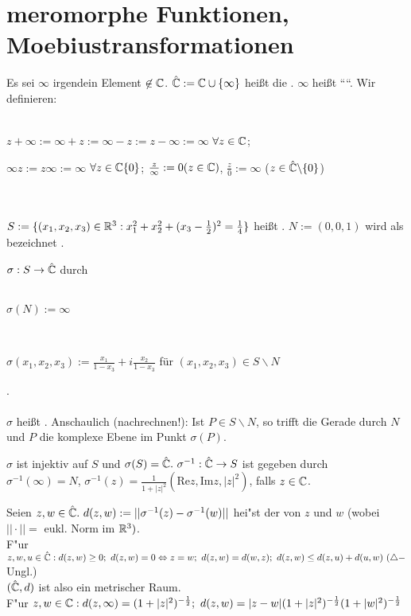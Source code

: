 \documentclass[a4paper,twoside,DIV15,BCOR12mm]{scrbook}
\begin{document}
\chapter{meromorphe Funktionen, Moebiustransformationen}
\begin{definition}
Es sei $\infty$ irgendein Element $\not \in \mathbb{C}$. $\hat{\mathbb{C}} := \mathbb{C} \cup \{ \infty
\}$ heißt die . $\infty$ heißt ````. Wir definieren: \\ \\
\centerline{$z + \infty := \infty + z := \infty -z := z - \infty := \infty$
$\forall z \in \mathbb{C}$;} \centerline{$\infty z := z \infty := \infty$ $\forall z \in \mathbb{C}
\{0\}$; $\frac{z}{\infty} := 0 (z \in \mathbb{C})$, $\frac{z}{0}:= \infty$ ($ z \in
\hat{\mathbb{C}} \backslash \{0\} $)}\\ \\
$S := \{ (x_1, x_2, x_3) \in \mathbb{R}^3: x_1^2+ x_2^2 + (x_3 - \frac{1}{2})^2 =
\frac{1}{4}\}$ heißt . $N := (0,0,1)$ wird als
 bezeichnet .
\end{definition}
\begin{definition}
$\sigma: S \to \hat{\mathbb{C}}$ durch \\ \\
\centerline{$\sigma(N) := \infty$} \\
\centerline{$\sigma(x_1, x_2, x_3) := \frac{x_1}{1-x_3} + i \frac{x_2}{1-x_3}$ für
$(x_1,x_2,x_3) \in S \backslash N$}. \\ \\
$\sigma$ heißt . Anschaulich
(nachrechnen!): Ist $P \in S \backslash N$, so trifft die Gerade durch $N$ und $P$
die komplexe Ebene im Punkt $\sigma(P)$.
\end{definition}

\begin{satz}
$\sigma$ ist injektiv auf $S$ und $\sigma(S) = \hat{\mathbb{C}}.\ \sigma^{-1}:
\hat{\mathbb{C}} \to S$ ist gegeben durch \\ $\sigma^{-1}(\infty) = N$, $\sigma^{-1}(z) =
\frac{1}{1+ |z|^2}(\text{Re} z, \text{Im} z, |z|^2)$, falls $z \in \mathbb{C}$.
\end{satz}
%
%
%

\begin{satz}
Seien $z,w \in \hat{\mathbb{C}}.\ d(z,w):= || \sigma^{-1}(z) - \sigma^{-1}(w) ||$ hei"st der  von $z$ und $w$ (wobei $||\cdot| |=$ eukl. Norm im $\mathbb{R}^3)$.\\
F"ur $z,w,u \in \hat{\MdC}: d(z,w) \geq 0;\ d(z,w)=0 \Leftrightarrow z=w;\ d(z,w)=d(w,z);\ d(z,w) \leq d(z,u) + d(u,w)\ (\triangle-$Ungl.)\\
$(\hat{\mathbb{C}},d)$ ist also ein metrischer Raum.\\
F"ur $z,w \in \mathbb{C}: d(z,\infty) = (1+|z|^2)^{-\frac12};\ d(z,w) = |z-w|(1+|z|^2)^{-\frac12}(1+|w|^2)^{-\frac12}$
\end{satz}
\end{document}
